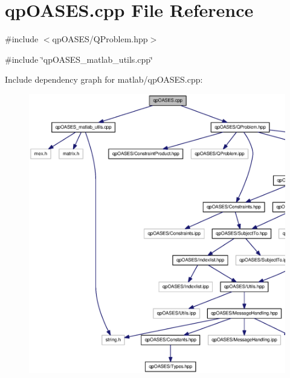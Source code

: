 \section{qpOASES.cpp File Reference}
\label{matlab_2qpOASES_8cpp}
{\ttfamily \#include $<$qpOASES/QProblem.hpp$>$}\par
{\ttfamily \#include \char`\"{}qpOASES\_\-matlab\_\-utils.cpp\char`\"{}}\par
Include dependency graph for matlab/qpOASES.cpp:
\nopagebreak
\begin{figure}[H]
\begin{center}
\leavevmode
\includegraphics[width=400pt]{matlab_2qpOASES_8cpp__incl}
\end{center}
\end{figure}
